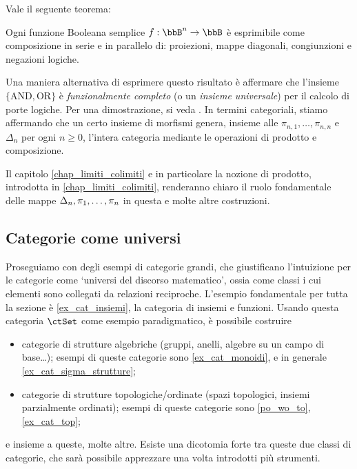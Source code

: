 Vale il seguente teorema:
\begin{theorem}\label{circ_thm}
	Ogni funzione Booleana semplice \(f :\bbB^n\to\bbB\) è esprimibile come composizione in serie e in parallelo di: proiezioni, mappe diagonali, congiunzioni e negazioni logiche.
\end{theorem}
Una maniera alternativa di esprimere questo risultato è affermare che l'insieme \(\{\text{AND},\text{OR}\}\) è \emph{funzionalmente completo} (o un \emph{insieme universale}) per il calcolo di porte logiche. Per una dimostrazione, si veda \cite[Teorema 1.4]{Crama2011}. In termini categoriali, stiamo affermando che un certo insieme di morfismi genera, insieme alle \(\pi_{n,1},\dots,\pi_{n,n}\) e \(\Delta_n\) per ogni \(n\ge 0\), l'intera categoria mediante le operazioni di prodotto e composizione.

Il capitolo \ref{chap_limiti_colimiti} e in particolare la nozione di prodotto, introdotta in \ref{chap_limiti_colimiti}, renderanno chiaro il ruolo fondamentale delle mappe \(\Delta_n,\tup{\pi}n,\) in questa e molte altre costruzioni.
\subsection{Categorie come universi}\label{ssec:categorie_universi}
Proseguiamo con degli esempi di categorie grandi, che giustificano l'intuizione per le categorie come `universi del discorso matematico', ossia come classi i cui elementi sono collegati da relazioni reciproche. L'esempio fondamentale per tutta la sezione è \ref{ex_cat_insiemi}, la categoria di insiemi e funzioni. Usando questa categoria \(\ctSet\) come esempio paradigmatico, è possibile costruire
\begin{itemize}
	\item categorie di strutture algebriche (gruppi, anelli, algebre su un campo di base\dots); esempi di queste categorie sono \ref{ex_cat_monoidi}, e in generale \ref{ex_cat_sigma_strutture};
	\item categorie di strutture topologiche/ordinate (spazi topologici, insiemi parzialmente ordinati); esempi di queste categorie sono \ref{po_wo_to}, \ref{ex_cat_top};
\end{itemize}
e insieme a queste, molte altre. Esiste una dicotomia forte tra queste due classi di categorie, che sarà possibile apprezzare una volta introdotti più strumenti.

